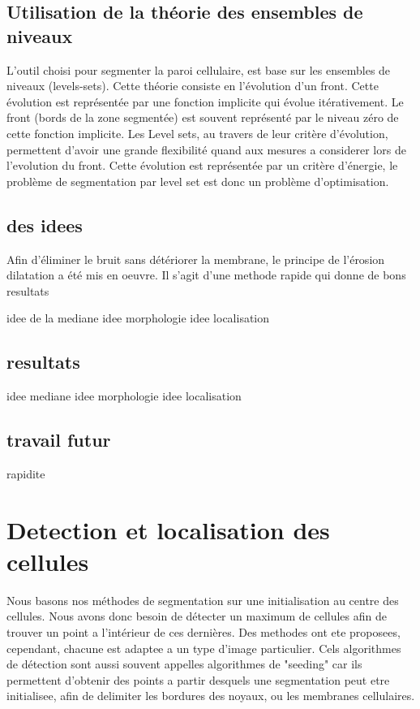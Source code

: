 \subsection{Utilisation de la théorie des ensembles de niveaux}

L'outil choisi pour segmenter la paroi cellulaire, est base sur les ensembles de niveaux (levels-sets). Cette théorie consiste en l'évolution d'un front. Cette évolution est représentée par une fonction implicite qui évolue itérativement. Le front (bords de la zone segmentée) est souvent représenté par le niveau zéro de cette fonction implicite.
Les Level sets, au travers de leur critère d'évolution, permettent d'avoir une grande flexibilité quand aux mesures a considerer lors de l'evolution du front. Cette évolution est représentée par un critère d'énergie, le problème de segmentation par level set est donc un problème d'optimisation.

\subsection{des idees}



Afin d'éliminer le bruit sans détériorer la membrane, le principe de l'érosion dilatation a été mis en oeuvre. Il s'agit d'une methode rapide qui donne de bons resultats


idee de la mediane
idee morphologie
idee localisation
\subsection{resultats}
idee mediane
idee morphologie
idee localisation
\subsection{travail futur}
rapidite



\section{Detection et localisation des cellules}

Nous basons nos méthodes de segmentation sur une initialisation au centre des cellules. Nous avons donc besoin de détecter un maximum de cellules afin de trouver un point a l'intérieur de ces dernières. Des methodes ont ete proposees, cependant, chacune est adaptee a un type d'image particulier.
Cels algorithmes de détection sont aussi souvent appelles algorithmes de "seeding" car ils permettent d'obtenir des points a partir desquels une segmentation peut etre initialisee, afin de delimiter les bordures des noyaux, ou les membranes cellulaires.

